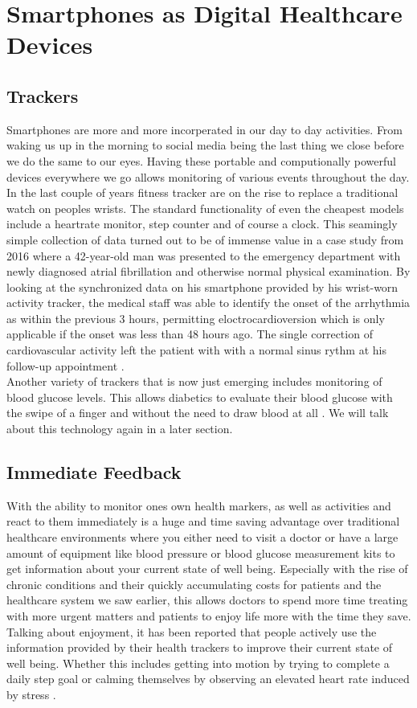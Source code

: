 \section{Smartphones as Digital Healthcare Devices}
\subsection{Trackers}
Smartphones are more and more incorperated in our day to day activities. From waking us up in the morning to social media being the last thing we close before we do the same to our eyes. Having these portable and computionally powerful devices everywhere we go allows monitoring of various events throughout the day. In the last couple of years fitness tracker are on the rise to replace a traditional watch on peoples wrists. The standard functionality of even the cheapest models include a heartrate monitor, step counter and of course a clock. This seamingly simple collection of data turned out to be of immense value in a case study from 2016 where a 42-year-old man was presented to the emergency department with newly diagnosed atrial fibrillation and otherwise normal physical examination. By looking at the synchronized data on his smartphone provided by his wrist-worn activity tracker, the medical staff was able to identify the onset of the arrhythmia as within the previous 3 hours, permitting eloctrocardioversion which is only applicable if the onset was less than 48 hours ago. The single correction of cardiovascular activity left the patient with with a normal sinus rythm at his follow-up appointment \cite{rudner2016interrogation}. \\
Another variety of trackers that is now just emerging includes monitoring of blood glucose levels. This allows diabetics to evaluate their blood glucose with the swipe of a finger and without the need to draw blood at all \cite{glucoseTracker}. We will talk about this technology again in a later section.
\subsection{Immediate Feedback}
With the ability to monitor ones own health markers, as well as activities and react to them immediately is a huge and time saving advantage over traditional healthcare environments where you either need to visit a doctor or have a large amount of equipment like blood pressure or blood glucose measurement kits to get information about your current state of well being. Especially with the rise of chronic conditions and their quickly accumulating costs for patients and the healthcare system we saw earlier, this allows doctors to spend more time treating with more urgent matters and patients to enjoy life more with the time they save. Talking about enjoyment, it has been reported that people actively use the information provided by their health trackers to improve their current state of well being. Whether this includes getting into motion by trying to complete a daily step goal \cite{rasche2015activity} or calming themselves by observing an elevated heart rate induced by stress \cite{mayya2015continuous}.

